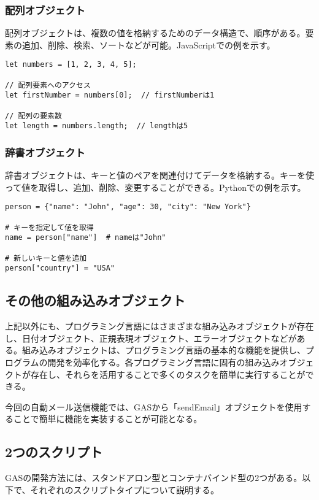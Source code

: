 \documentclass{jsarticle}
\begin{document}
\subsubsection{配列オブジェクト}
配列オブジェクトは、複数の値を格納するためのデータ構造で、順序がある。要素の追加、削除、検索、ソートなどが可能。JavaScriptでの例を示す。

\begin{verbatim}
let numbers = [1, 2, 3, 4, 5];

// 配列要素へのアクセス
let firstNumber = numbers[0];  // firstNumberは1

// 配列の要素数
let length = numbers.length;  // lengthは5
\end{verbatim}

\subsubsection{辞書オブジェクト}
辞書オブジェクトは、キーと値のペアを関連付けてデータを格納する。キーを使って値を取得し、追加、削除、変更することができる。Pythonでの例を示す。

\begin{verbatim}
person = {"name": "John", "age": 30, "city": "New York"}

# キーを指定して値を取得
name = person["name"]  # nameは"John"

# 新しいキーと値を追加
person["country"] = "USA"
\end{verbatim}

\subsection{その他の組み込みオブジェクト}
上記以外にも、プログラミング言語にはさまざまな組み込みオブジェクトが存在し、日付オブジェクト、正規表現オブジェクト、エラーオブジェクトなどがある。組み込みオブジェクトは、プログラミング言語の基本的な機能を提供し、プログラムの開発を効率化する。各プログラミング言語に固有の組み込みオブジェクトが存在し、それらを活用することで多くのタスクを簡単に実行することができる。
\par 今回の自動メール送信機能では、GASから「sendEmail」オブジェクトを使用することで簡単に機能を実装することが可能となる。

\subsection{2つのスクリプト}
GASの開発方法には、スタンドアロン型とコンテナバインド型の2つがある。以下で、それぞれのスクリプトタイプについて説明する。
\end{document}
